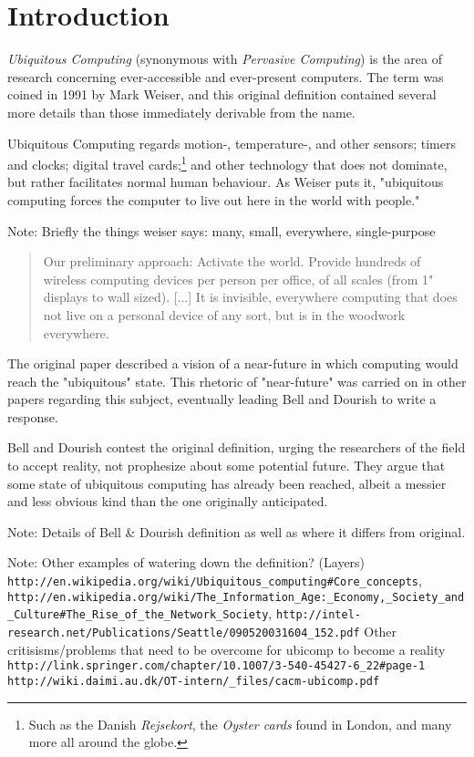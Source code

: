 \section{Introduction}

\emph{Ubiquitous Computing} (synonymous with \emph{Pervasive Computing}) is the area of research concerning
ever-accessible and ever-present computers. The term was coined in 1991 by Mark Weiser, and this original
definition contained several more details than those immediately derivable from the name.

Ubiquitous Computing regards motion-, temperature-, and other sensors; timers and clocks; digital travel
cards;\footnote{Such as the Danish \emph{Rejsekort}, the \emph{Oyster cards} found in London, and many more
all around the globe.} and other technology that does not dominate, but rather facilitates normal human
behaviour. As Weiser puts it, "ubiquitous computing forces the computer to live out here in the world with
people."\cite{weiseronline}

Note: Briefly the things weiser says: many, small, everywhere, single-purpose\cite{weiser91}

\begin{quote}
     Our preliminary approach: Activate the world. Provide hundreds of wireless computing devices per person per
     office, of all scales (from 1" displays to wall sized). [...] It is invisible, everywhere computing that does
     not live on a personal device of any sort, but is in the woodwork everywhere.\cite{weiseronline}
\end{quote}

The original paper described a vision of a near-future in which computing would reach the "ubiquitous" state.
This rhetoric of "near-future" was carried on in other papers regarding this subject, eventually leading Bell
and Dourish to write a response.

Bell and Dourish contest the original definition, urging the researchers of the field to accept reality, not
prophesize about some potential future. They argue that some state of ubiquitous computing has already been
reached, albeit a messier and less obvious kind than the one originally anticipated.

Note: Details of Bell \& Dourish definition as well as where it differs from original.\cite{bell07}

Note:
Other examples of watering down the definition? (Layers)
\verb+http://en.wikipedia.org/wiki/Ubiquitous_computing#Core_concepts+,
\verb+http://en.wikipedia.org/wiki/The_Information_Age:_Economy,_Society_and_Culture#The_Rise_of_the_Network_Society+,
\verb+http://intel-research.net/Publications/Seattle/090520031604_152.pdf+
Other critisisms/problems that need to be overcome for ubicomp to become a reality
\verb+http://link.springer.com/chapter/10.1007/3-540-45427-6_22#page-1+
\verb+http://wiki.daimi.au.dk/OT-intern/_files/cacm-ubicomp.pdf+

